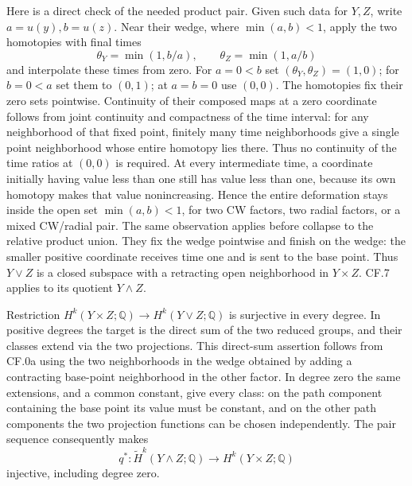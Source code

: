 \documentclass[
  11pt,
]{article}
\begin{document}
Here is a direct check of the needed product pair. Given such data for
\(Y,Z\), write \(a=u(y),b=u(z)\). Near their wedge, where
\(\min(a,b)<1\), apply the two homotopies with final times \[
\theta_Y=\min(1,b/a),\qquad \theta_Z=\min(1,a/b)
\] and interpolate these times from zero. For \(a=0<b\) set
\((\theta_Y,\theta_Z)=(1,0)\); for \(b=0<a\) set them to \((0,1)\); at
\(a=b=0\) use \((0,0)\). The homotopies fix their zero sets pointwise.
Continuity of their composed maps at a zero coordinate follows from
joint continuity and compactness of the time interval: for any
neighborhood of that fixed point, finitely many time neighborhoods give
a single point neighborhood whose entire homotopy lies there. Thus no
continuity of the time ratios at \((0,0)\) is required. At every
intermediate time, a coordinate initially having value less than one
still has value less than one, because its own homotopy makes that value
nonincreasing. Hence the entire deformation stays inside the open set
\(\min(a,b)<1\), for two CW factors, two radial factors, or a mixed
CW/radial pair. The same observation applies before collapse to the
relative product union. They fix the wedge pointwise and finish on the
wedge: the smaller positive coordinate receives time one and is sent to
the base point. Thus \(Y\vee Z\) is a closed subspace with a retracting
open neighborhood in \(Y\times Z\). CF.7 applies to its quotient
\(Y\wedge Z\).

Restriction \(H^k(Y\times Z;\mathbb Q)\to H^k(Y\vee Z;\mathbb Q)\) is
surjective in every degree. In positive degrees the target is the direct
sum of the two reduced groups, and their classes extend via the two
projections. This direct-sum assertion follows from CF.0a using the two
neighborhoods in the wedge obtained by adding a contracting base-point
neighborhood in the other factor. In degree zero the same extensions,
and a common constant, give every class: on the path component
containing the base point its value must be constant, and on the other
path components the two projection functions can be chosen
independently. The pair sequence consequently makes \[
q^*:\widetilde H^k(Y\wedge Z;\mathbb Q)\longrightarrow H^k(Y\times Z;\mathbb Q)
\tag{CF.19}
\] injective, including degree zero.
\end{document}
